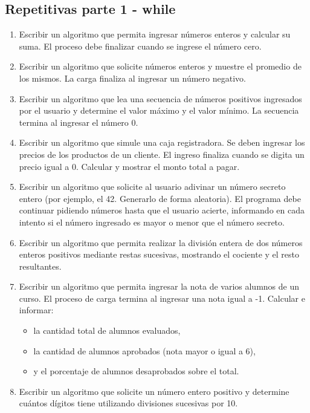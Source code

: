 \begin{ejercicioClase}
  \subsection*{Repetitivas parte 1 - while}
  \begin{enumerate}
    \item Escribir un algoritmo que permita ingresar números enteros y calcular su suma. El proceso debe finalizar cuando se ingrese el número cero.
    \item Escribir un algoritmo que solicite números enteros y muestre el promedio de los mismos. La carga finaliza al ingresar un número negativo.
    \item Escribir un algoritmo que lea una secuencia de números positivos ingresados por el usuario y determine el valor máximo y el valor mínimo. La secuencia termina al ingresar el número 0.
    \item Escribir un algoritmo que simule una caja registradora. Se deben ingresar los precios de los productos de un cliente. El ingreso finaliza cuando se digita un precio igual a 0. Calcular y mostrar el monto total a pagar.
    \item Escribir un algoritmo que solicite al usuario adivinar un número secreto entero (por ejemplo, el 42. Generarlo de forma aleatoria). El programa debe continuar pidiendo números hasta que el usuario acierte, informando en cada intento si el número ingresado es mayor o menor que el número secreto.
    \item Escribir un algoritmo que permita realizar la división entera de dos números enteros positivos mediante restas sucesivas, mostrando el cociente y el resto resultantes.
    \item Escribir un algoritmo que permita ingresar la nota de varios alumnos de un curso. El proceso de carga termina al ingresar una nota igual a -1. Calcular e informar:
      \begin{itemize}
        \item la cantidad total de alumnos evaluados,
        \item la cantidad de alumnos aprobados (nota mayor o igual a 6),
        \item y el porcentaje de alumnos desaprobados sobre el total.
      \end{itemize}
    \item Escribir un algoritmo que solicite un número entero positivo y determine cuántos dígitos tiene utilizando divisiones sucesivas por 10.

\end{enumerate}
\end{ejercicioClase}
